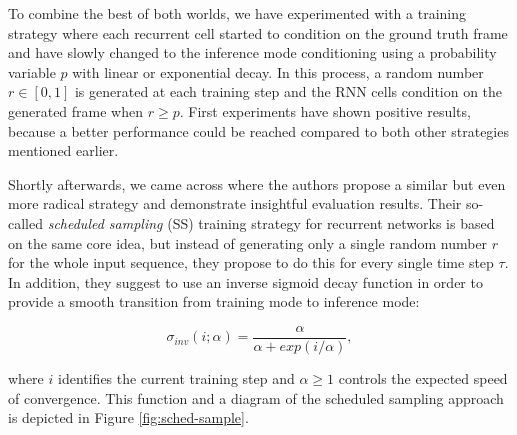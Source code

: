 To combine the best of both worlds, we have experimented with a training strategy where each recurrent cell started to condition on the ground truth frame and have slowly changed to the inference mode conditioning using a probability variable $p$ with linear or exponential decay. In this process, a random number $r \in [0, 1]$ is generated at each training step and the RNN cells condition on the generated frame when $r \geq p$. First experiments have shown positive results, because a better performance could be reached compared to both other strategies mentioned earlier. 

Shortly afterwards, we came across \parencite{sched_sample} where the authors propose a similar but even more radical strategy and demonstrate insightful evaluation results. Their so-called \textit{scheduled sampling} (SS) training strategy for recurrent networks is based on the same core idea, but instead of generating only a single random number $r$ for the whole input sequence, they propose to do this for every single time step $\tau$. In addition, they suggest to use an inverse sigmoid decay function in order to provide a smooth transition from training mode to inference mode:

\begin{equation} \label{eq:inverse-sigmoid}
\sigma_{inv}(i; \alpha) = \frac{\alpha}{\alpha + exp(i / \alpha)} ,
\end{equation}

where $i$ identifies the current training step and $\alpha \geq 1$ controls the expected speed of convergence. This function and a diagram of the scheduled sampling approach is depicted in Figure \ref{fig:sched-sample}.

